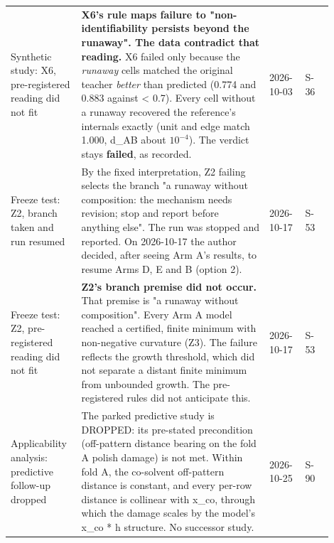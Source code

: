{\begin{longtable}{R{0.18\linewidth} R{0.54\linewidth} R{0.10\linewidth} R{0.08\linewidth}}
Synthetic study: X6, pre-registered reading did not fit & \textbf{X6's rule maps failure to "non-identifiability persists beyond the runaway". The data contradict that reading.} X6 failed only because the \emph{runaway} cells matched the original teacher \emph{better} than predicted (0.774 and 0.883 against < 0.7). Every cell without a runaway recovered the reference's internals exactly (unit and edge match 1.000, d\_AB about $10^{-4}$). The verdict stays \textbf{failed}, as recorded. & 2026-10-03 & S-36 \\
Freeze test: Z2, branch taken and run resumed & By the fixed interpretation, Z2 failing selects the branch "a runaway without composition: the mechanism needs revision; stop and report before anything else". The run was stopped and reported. On 2026-10-17 the author decided, after seeing Arm A's results, to resume Arms D, E and B (option 2). & 2026-10-17 & S-53 \\
Freeze test: Z2, pre-registered reading did not fit & \textbf{Z2's branch premise did not occur.} That premise is "a runaway without composition". Every Arm A model reached a certified, finite minimum with non-negative curvature (Z3). The failure reflects the growth threshold, which did not separate a distant finite minimum from unbounded growth. The pre-registered rules did not anticipate this. & 2026-10-17 & S-53 \\
Applicability analysis: predictive follow-up dropped & The parked predictive study is DROPPED: its pre-stated precondition (off-pattern distance bearing on the fold A polish damage) is not met. Within fold A, the co-solvent off-pattern distance is constant, and every per-row distance is collinear with x\_co, through which the damage scales by the model's x\_co * h structure. No successor study. & 2026-10-25 & S-90 \\
\bottomrule
\end{longtable}}